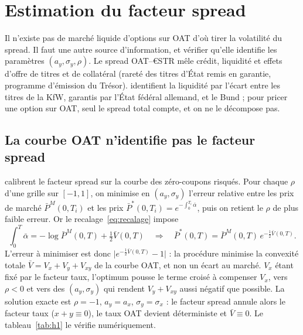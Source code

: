 \section{Estimation du facteur spread}
\label{sec:spread}

Il n'existe pas de marché liquide d'options sur OAT d'où tirer la volatilité du spread. Il faut une autre
source d'information, et vérifier qu'elle identifie les paramètres $(a_y, \sigma_y, \rho)$. Le spread OAT–€STR
mêle crédit, liquidité et effets d'offre de titres et de collatéral (rareté des titres d'État remis en garantie,
programme d'émission du Trésor). \citet{MonfortRenne2014} identifient la liquidité par l'écart entre les titres
de la KfW, garantis par l'État fédéral allemand, et le Bund ; pour pricer une option sur OAT, seul le spread
total compte, et on ne le décompose pas.

\subsection{La courbe OAT n'identifie pas le facteur spread}
\label{sec:h1}

\citet[éq.~56-57]{Russo} calibrent le facteur spread sur la courbe des zéro-coupons risqués. Pour chaque
$\rho$ d'une grille sur $[-1,1]$, on minimise en $(a_y,\sigma_y)$ l'erreur relative entre les prix de marché
$\bar P^M(0,T_i)$ et les prix $\bar P^\ast(0,T_i) = e^{-\int_0^{T_i}\bar\alpha}$, puis on retient le $\rho$ de
plus faible erreur. Or le recalage~\eqref{eq:recalage} impose
\begin{equation}
\int_0^T\bar\alpha = -\log\bar P^M(0,T) + \tfrac12\bar V(0,T)\quad\Longrightarrow\quad
\bar P^\ast(0,T) = \bar P^M(0,T)\,e^{-\frac12\bar V(0,T)}.
\end{equation}
L'erreur à minimiser est donc $\big|e^{-\frac12\bar V(0,T)} - 1\big|$ : la procédure minimise la convexité
totale $\bar V = V_x + V_y + V_{xy}$ de la courbe OAT, et non un écart au marché. $V_x$ étant fixé par le facteur
taux, l'optimum pousse le terme croisé à compenser $V_x$, vers $\rho < 0$ et vers des $(a_y,\sigma_y)$ qui
rendent $V_y + V_{xy}$ aussi négatif que possible. La solution exacte est $\rho = -1$, $a_y = a_x$,
$\sigma_y = \sigma_x$ : le facteur spread annule alors le facteur taux ($x + y \equiv 0$), le taux OAT devient
déterministe et $\bar V \equiv 0$. Le tableau~\ref{tab:h1} le vérifie numériquement.

